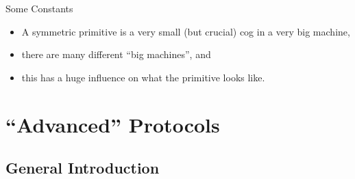 \documentclass[presentation,aspectratio=1610]{beamer}
\begin{document}
\begin{frame}{Some Constants}
  \begin{itemize}
    \setlength\itemsep{1cm}
    \large
  \item A symmetric primitive is a very \alert{small} (but crucial) cog in a
    very big machine, \pause
  \item there are many \alert{different} ``big machines'', and \pause
  \item this has a \alert{huge influence} on what the primitive looks like.
  \end{itemize}
\end{frame}


\section{``Advanced'' Protocols}

\subsection{General Introduction}
\end{document}
